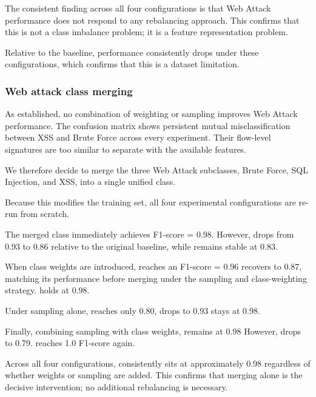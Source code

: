 The consistent finding across all four configurations is that Web Attack performance does not respond to any rebalancing approach. This confirms that this is not a class imbalance problem; it is a feature representation problem.

Relative to the baseline,  performance consistently drops under these configurations, which confirms that this is a dataset limitation.

\subsubsection{Web attack class merging}

As established, no combination of weighting or sampling improves Web Attack performance. The confusion matrix shows persistent mutual misclassification between XSS and Brute Force across every experiment. Their flow-level signatures are too similar to separate with the available features.

We therefore decide to merge the three Web Attack subclasses, Brute Force, SQL Injection, and XSS, into a single unified  class.

Because this modifies the training set, all four experimental configurations are re-run from scratch.

The merged  class immediately achieves F1-score = 0.98. However,  drops from 0.93 to 0.86 relative to the original baseline, while  remains stable at 0.83.

When class weights are introduced,  reaches an F1-score = 0.96  recovers to 0.87, matching its performance before merging under the sampling and class-weighting strategy.  holds at 0.98.

Under sampling alone,  reaches only 0.80,  drops to 0.93  stays at 0.98.

Finally, combining sampling with class weights,  remains at 0.98 However,  drops to 0.79.  reaches 1.0 F1-score again.

Across all four configurations,  consistently sits at approximately 0.98 regardless of whether weights or sampling are added. This confirms that merging alone is the decisive intervention; no additional rebalancing is necessary.

